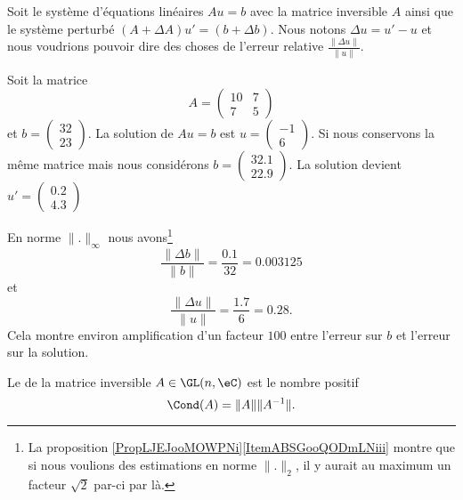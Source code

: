 Soit le système d'équations linéaires \( Au=b\) avec la matrice inversible \( A\) ainsi que le système perturbé \( (A+\Delta A)u'=(b+\Delta b)\). Nous notons \( \Delta u=u'-u\) et nous voudrions pouvoir dire des choses de l'erreur relative \( \frac{ \| \Delta u \| }{ \| u \| }\).

\begin{example}
    Soit la matrice
    \begin{equation}
        A=\begin{pmatrix}
            10    &   7    \\ 
            7    &   5    
        \end{pmatrix}
    \end{equation}
    et \( b=\begin{pmatrix}
        32    \\ 
        23    
    \end{pmatrix}\). La solution de \( Au=b\) est \( u=\begin{pmatrix}
        -1    \\ 
        6    
    \end{pmatrix}\). Si nous conservons la même matrice mais nous considérons \( b=\begin{pmatrix}
        32.1    \\ 
        22.9    
    \end{pmatrix}\). La solution devient \( u'=\begin{pmatrix}
        0.2    \\ 
        4.3    
    \end{pmatrix}\)

    En norme \( \| . \|_{\infty}\) nous avons\footnote{La proposition \ref{PropLJEJooMOWPNi}\ref{ItemABSGooQODmLNiii} montre que si nous voulions des estimations en norme \( \| . \|_2\), il y aurait au maximum un facteur \( \sqrt{2}\) par-ci par là.}
    \begin{equation}
        \frac{ \| \Delta b \| }{ \| b \| }=\frac{ 0.1 }{ 32 }=0.003125
    \end{equation}
    et
    \begin{equation}
        \frac{ \| \Delta u \| }{ \| u \| }=\frac{ 1.7 }{ 6 }=0.28.
    \end{equation}
    Cela montre environ amplification d'un facteur \( 100\) entre l'erreur sur \( b\) et l'erreur sur la solution.
\end{example}

\begin{definition}
    Le  de la matrice inversible \( A\in \GL(n,\eC)\) est le nombre positif
    \begin{equation}
        \Cond(A)=\| A \|\| A^{-1} \|.
    \end{equation}
\end{definition}

